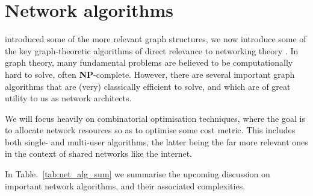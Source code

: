 %
%

\section{Network algorithms} \label{sec:graph_theory} 

 introduced some of the more relevant graph structures, we now introduce some of the key graph-theoretic algorithms of direct relevance to networking theory \cite{bib:RivestAlgBook}. In graph theory, many fundamental problems are believed to be computationally hard to solve, often \textbf{NP}-complete. However, there are several important graph algorithms that are (very) classically efficient to solve, and which are of great utility to us as network architects.

We will focus heavily on combinatorial optimisation techniques, where the goal is to allocate network resources so as to optimise some cost metric. This includes both single- and multi-user algorithms, the latter being the far more relevant ones in the context of shared networks like the internet.

In Table.~\ref{tab:net_alg_sum} we summarise the upcoming discussion on important network algorithms, and their associated complexities.

